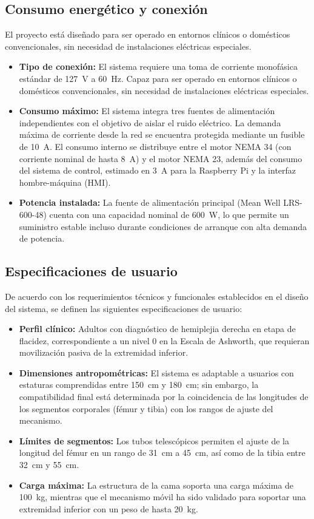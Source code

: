 \subsection{Consumo energético y conexión}
El proyecto está diseñado para ser operado en entornos clínicos o domésticos convencionales, sin necesidad de instalaciones eléctricas especiales.
\begin{itemize}
	\item \textbf{Tipo de conexión:}  
	El sistema requiere una toma de corriente monofásica estándar de \SI{127}{\volt} a \SI{60}{\hertz}. Capaz para ser operado en entornos clínicos o domésticos convencionales, sin necesidad de instalaciones eléctricas especiales.

	\item \textbf{Consumo máximo:}  
    El sistema integra tres fuentes de alimentación independientes con el objetivo de aislar el ruido eléctrico. La demanda máxima de corriente desde la red se encuentra protegida mediante un fusible de \SI{10}{\ampere}. El consumo interno se distribuye entre el motor NEMA 34 (con corriente nominal de hasta \SI{8}{\ampere}) y el motor NEMA 23, además del consumo del sistema de control, estimado en \SI{3}{\ampere} para la Raspberry Pi y la interfaz hombre-máquina (HMI).

	\item \textbf{Potencia instalada:}  
	La fuente de alimentación principal (Mean Well LRS-600-48) cuenta con una capacidad nominal de \SI{600}{\watt}, lo que permite un suministro estable incluso durante condiciones de arranque con alta demanda de potencia.
\end{itemize}
\subsection{Especificaciones de usuario}
De acuerdo con los requerimientos técnicos y funcionales establecidos en el diseño del sistema, se definen las siguientes especificaciones de usuario:
\begin{itemize}
	\item \textbf{Perfil clínico:}  
	Adultos con diagnóstico de hemiplejia derecha en etapa de flacidez, correspondiente a un nivel 0 en la Escala de Ashworth, que requieran movilización pasiva de la extremidad inferior.
	\item \textbf{Dimensiones antropométricas:}  
	El sistema es adaptable a usuarios con estaturas comprendidas entre \SI{150}{\centi\meter} y \SI{180}{\centi\meter}; sin embargo, la compatibilidad final está determinada por la coincidencia de las longitudes de los segmentos corporales (fémur y tibia) con los rangos de ajuste del mecanismo.
	\item \textbf{Límites de segmentos:}  
	Los tubos telescópicos permiten el ajuste de la longitud del fémur en un rango de \SI{31}{\centi\meter} a \SI{45}{\centi\meter}, así como de la tibia entre \SI{32}{\centi\meter} y \SI{55}{\centi\meter}.
	\item \textbf{Carga máxima:}  
	La estructura de la cama soporta una carga máxima de \SI{100}{\kilo\gram}, mientras que el mecanismo móvil ha sido validado para soportar una extremidad inferior con un peso de hasta \SI{20}{\kilo\gram}.
\end{itemize}

